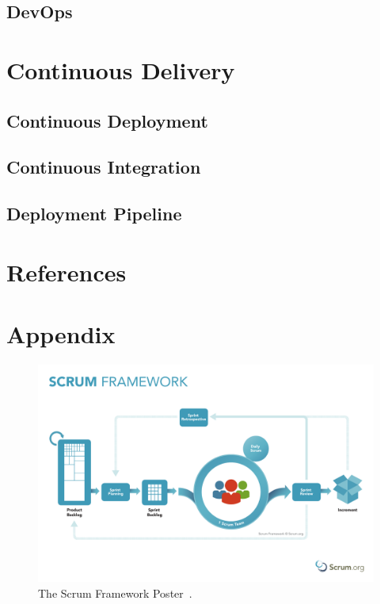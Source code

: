 \documentclass[12pt,a4paper]{article}
\theoremstyle{definition}
\begin{document}
    \subsection{DevOps}

\section{Continuous Delivery}

    \subsection{Continuous Deployment}

    \subsection{Continuous Integration}

    \subsection{Deployment Pipeline}

\newpage

\section{References}

\begin{flushleft}
    
\end{flushleft}

\newpage

\section{Appendix}

    \begin{figure}[H]
        \centering
        \includegraphics[scale=0.4]{img/ScrumFramework.pdf}
        \caption{The Scrum Framework Poster~\cite{ScrumOrgPoster}.}
        \label{fig:ScrumOrgPoster}
    \end{figure}
\end{document}
